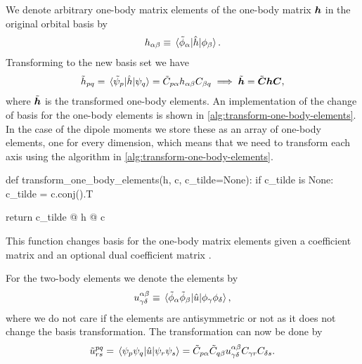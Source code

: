         We denote arbitrary one-body matrix elements of the one-body matrix
        $\boldsymbol{h}$ in the original orbital basis by
        \begin{align}
            h_{\alpha \beta}
            \equiv
            \mel*{\tilde{\phi}_{\alpha}}{\hat{h}}{\phi_{\beta}}.
        \end{align}
        Transforming to the new basis set we have
        \begin{gather}
            \tilde{h}_{pq}
            = \mel*{\tilde{\psi}_p}{\hat{h}}{\psi_q}
            =
            \tilde{C}_{p\alpha}
            h_{\alpha \beta}
            C_{\beta q}
            \implies
            \tilde{\boldsymbol{h}}
            = \tilde{\boldsymbol{C}}
            \boldsymbol{h}
            \boldsymbol{C},
        \end{gather}
        where $\tilde{\boldsymbol{h}}$ is the transformed one-body elements.
        An implementation of the change of basis for the one-body elements is
        shown in \autoref{alg:transform-one-body-elements}.
        In the case of the dipole moments we store these as an array of one-body
        elements, one for every dimension, which means that we need to transform
        each axis using the algorithm in
        \autoref{alg:transform-one-body-elements}.
        \begin{algorithm}
            \begin{python}
def transform_one_body_elements(h, c, c_tilde=None):
    if c_tilde is None:
        c_tilde = c.conj().T

    return c_tilde @ h @ c
            \end{python}
            \caption{This function changes basis for the one-body matrix
            elements given a coefficient matrix  and an optional dual
            coefficient matrix .}
            \label{alg:transform-one-body-elements}
        \end{algorithm}
        For the two-body elements we denote the elements by
        \begin{align}
            u^{\alpha\beta}_{\gamma\delta}
            \equiv
            \mel*{\tilde{\phi}_{\alpha}\tilde{\phi}_{\beta}}{
                \hat{u}
            }{\phi_{\gamma}\phi_{\delta}},
        \end{align}
        where we do not care if the elements are antisymmetric or not as it does
        not change the basis transformation.
        The transformation can now be done by
        \begin{align}
            \tilde{u}^{pq}_{rs}
            = \mel*{\psi_p\psi_q}{
                \hat{u}
            }{\psi_r\psi_s}
            = \tilde{C}_{p\alpha}
            \tilde{C}_{q\beta}
            u^{\alpha\beta}_{\gamma\delta}
            C_{\gamma r}
            C_{\delta s}.
        \end{align}
